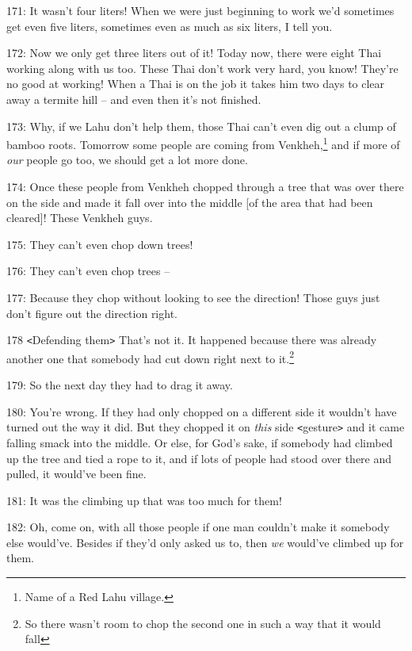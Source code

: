 171: It wasn't four liters! When we were just beginning to work we'd sometimes
get even five liters, sometimes even as much as six liters, I tell you.

172: Now we only get three liters out of it! Today now, there were eight Thai working
along with us too. These Thai don't work very hard, you know! They're no good at
working! When a Thai is on the job it takes him two days to clear away a termite
hill -- and even then it's not finished.

173: Why, if we Lahu don't help them, those Thai can't even dig out a clump of
bamboo roots. Tomorrow some people are coming from Venkheh,\footnote{Name of a Red Lahu village.} and if more of
\textit{our} people go too, we should get a lot more done.

174: Once these people from Venkheh chopped through a tree that was over there
on the side and made it fall over into the middle [of the area that had been cleared]!
These Venkheh guys.

175: They can't even chop down trees!

176: They can't even chop trees --

177: Because they chop without looking to see the direction! Those guys just don't
figure out the direction right.

178 \texttt{<}Defending them\texttt{>} That's not it. It happened because there
was already another one that somebody had cut down right next to it.\footnote{So there wasn't room to chop the second one in such a way that it would fall}

179: So the next day they had to drag it away.

180: You're wrong. If they had only chopped on a different side it wouldn't have
turned out the way it did. But they chopped it on \textit{this} side \texttt{<}gesture\texttt{>}
and it came falling smack into the middle. Or else, for God's sake, if somebody
had climbed up the tree and tied a rope to it, and if lots of people had stood
over there and pulled, it would've been fine.

181: It was the climbing up that was too much for them!

182: Oh, come on, with all those people if one man couldn't make it somebody else
would've. Besides if they'd only asked us to, then \textit{we} would've climbed
up for them.

